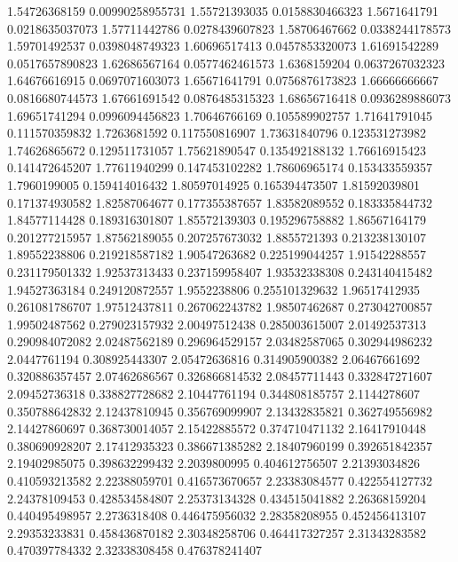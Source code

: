   1.54726368159  0.00990258955731
  1.55721393035  0.0158830466323
   1.5671641791  0.0218635037073
  1.57711442786  0.0278439607823
  1.58706467662  0.0338244178573
  1.59701492537  0.0398048749323
  1.60696517413  0.0457853320073
  1.61691542289  0.0517657890823
  1.62686567164  0.0577462461573
   1.6368159204  0.0637267032323
  1.64676616915  0.0697071603073
  1.65671641791  0.0756876173823
  1.66666666667  0.0816680744573
  1.67661691542  0.0876485315323
  1.68656716418  0.0936289886073
  1.69651741294  0.0996094456823
  1.70646766169   0.105589902757
  1.71641791045   0.111570359832
   1.7263681592   0.117550816907
  1.73631840796   0.123531273982
  1.74626865672   0.129511731057
  1.75621890547   0.135492188132
  1.76616915423   0.141472645207
  1.77611940299   0.147453102282
  1.78606965174   0.153433559357
   1.7960199005   0.159414016432
  1.80597014925   0.165394473507
  1.81592039801   0.171374930582
  1.82587064677   0.177355387657
  1.83582089552   0.183335844732
  1.84577114428   0.189316301807
  1.85572139303   0.195296758882
  1.86567164179   0.201277215957
  1.87562189055   0.207257673032
   1.8855721393   0.213238130107
  1.89552238806   0.219218587182
  1.90547263682   0.225199044257
  1.91542288557   0.231179501332
  1.92537313433   0.237159958407
  1.93532338308   0.243140415482
  1.94527363184   0.249120872557
   1.9552238806   0.255101329632
  1.96517412935   0.261081786707
  1.97512437811   0.267062243782
  1.98507462687   0.273042700857
  1.99502487562   0.279023157932
  2.00497512438   0.285003615007
  2.01492537313   0.290984072082
  2.02487562189   0.296964529157
  2.03482587065   0.302944986232
   2.0447761194   0.308925443307
  2.05472636816   0.314905900382
  2.06467661692   0.320886357457
  2.07462686567   0.326866814532
  2.08457711443   0.332847271607
  2.09452736318   0.338827728682
  2.10447761194   0.344808185757
   2.1144278607   0.350788642832
  2.12437810945   0.356769099907
  2.13432835821   0.362749556982
  2.14427860697   0.368730014057
  2.15422885572   0.374710471132
  2.16417910448   0.380690928207
  2.17412935323   0.386671385282
  2.18407960199   0.392651842357
  2.19402985075   0.398632299432
   2.2039800995   0.404612756507
  2.21393034826   0.410593213582
  2.22388059701   0.416573670657
  2.23383084577   0.422554127732
  2.24378109453   0.428534584807
  2.25373134328   0.434515041882
  2.26368159204   0.440495498957
   2.2736318408   0.446475956032
  2.28358208955   0.452456413107
  2.29353233831   0.458436870182
  2.30348258706   0.464417327257
  2.31343283582   0.470397784332
  2.32338308458   0.476378241407
